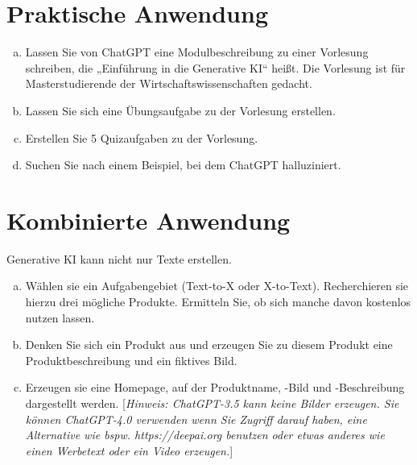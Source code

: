 \documentclass[12pt,ngerman]{AssignmentClass}
\begin{document}
    
    
    \section{Praktische Anwendung}
    
        \begin{enumerate}[a)]
    		\item Lassen Sie von ChatGPT eine Modulbeschreibung zu einer Vorlesung schreiben, die „Einführung in die Generative KI“ heißt. Die Vorlesung ist für Masterstudierende der Wirtschaftswissenschaften gedacht.
    		\item Lassen Sie sich eine Übungsaufgabe zu der Vorlesung erstellen.
    		\item Erstellen Sie 5 Quizaufgaben zu der Vorlesung.
            \item Suchen Sie nach einem Beispiel, bei dem ChatGPT halluziniert.
    	\end{enumerate}

    
    \newpage
    
    \section{Kombinierte Anwendung}
    
        Generative KI kann nicht nur Texte erstellen.
        
        \begin{enumerate}[a)]
            \item Wählen sie ein Aufgabengebiet (Text-to-X oder X-to-Text). Recherchieren sie hierzu drei mögliche Produkte. Ermitteln Sie, ob sich manche davon kostenlos nutzen lassen.
            \item Denken Sie sich ein Produkt aus und erzeugen Sie zu diesem Produkt eine Produktbeschreibung und ein fiktives Bild.

            \item Erzeugen sie eine Homepage, auf der Produktname, -Bild und -Beschreibung dargestellt werden. [\textit{Hinweis: ChatGPT-3.5 kann keine Bilder erzeugen. Sie können ChatGPT-4.0 verwenden wenn Sie Zugriff darauf haben, eine Alternative wie bspw. https://deepai.org benutzen oder etwas anderes wie einen Werbetext oder ein Video erzeugen.}]
        \end{enumerate}
\end{document}
